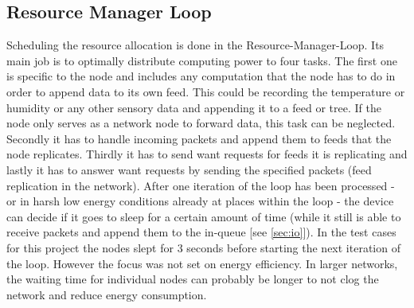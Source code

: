 \subsection{Resource Manager Loop}
\label{sec:loop}
Scheduling the resource allocation is done in the Resource-Manager-Loop. Its main job is to optimally distribute computing power to four tasks. The first one is specific to the node and includes any computation that the node has to do in order to append data to its own feed. This could be recording the temperature or humidity or any other sensory data and appending it to a feed or tree. If the node only serves as a network node to forward data, this task can be neglected. Secondly it has to handle incoming packets and append them to feeds that the node replicates. Thirdly it has to send want requests for feeds it is replicating and lastly it has to answer want requests by sending the specified packets (feed replication in the network). After one iteration of the loop has been processed - or in harsh low energy conditions already at places within the loop - the device can decide if it goes to sleep for a certain amount of time (while it still is able to receive packets and append them to the in-queue [see \cref{sec:io}]). In the test cases for this project the nodes slept for 3 seconds before starting the next iteration of the loop. However the focus was not set on energy efficiency. In larger networks, the waiting time for individual nodes can probably be longer to not clog the network and reduce energy consumption.

